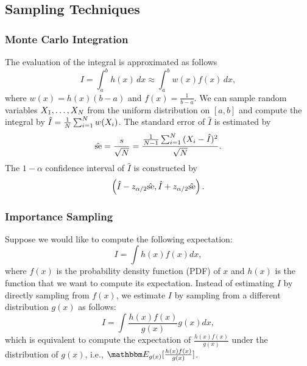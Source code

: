     
\subsection{Sampling Techniques}
    \subsubsection{Monte Carlo Integration}
        The evaluation of the integral is approximated as follows
            \begin{equation}
                I = \int_{a}^{b}{h(x) \, dx} \approx \int_{a}^{b}{w(x) f(x) \, dx},
            \end{equation}
        where $w(x) = h(x)(b-a)$ and $f(x) = \frac{1}{b-a}$.
        We can sample \ndata random variables $X_1, \ldots, X_{N}$ from the uniform distribution on $[a, b]$ and compute the integral by $\hat{I} = \frac{1}{N}\sum_{i=1}^{N}{w(X_i)}$.
        The standard error of $\hat{I}$ is estimated by
            \begin{equation}
                \hat{\text{se}} = \frac{s}{\sqrt{N}} = \frac{ \frac{1}{N-1}\sum_{i=1}^{N}{(X_i - \hat{I} )^2}}{\sqrt{N}}.
            \end{equation}
        The $1-\alpha$ confidence interval of $\hat{I}$ is constructed by
            \begin{equation}
                \left( \hat{I} - z_{\alpha/2}\hat{\text{se}}, \hat{I}+ z_{\alpha/2}\hat{\text{se}} \right).
            \end{equation}
        
    \subsubsection{Importance Sampling}
        Suppose we would like to compute the following expectation:
            \begin{equation}
                I = \int h(x) f(x) d x,
            \end{equation}
        where $f(x)$ is the probability density function (PDF) of $x$ and  $h(x)$ is the function that we want to compute its expectation. 
        Instead of estimating $I$ by directly sampling from $f(x)$, we estimate $I$ by sampling from a different distribution $g(x)$ as follows:
            \begin{equation}\label{eq:importance_sampling}
                I = \int \frac{h(x) f(x)}{g(x)} g(x) dx,
            \end{equation}
        which is equivalent to compute the expectation of $\frac{h(x) f(x)}{g(x)}$ under the distribution of $g(x)$, i.e., $\E_{g(x)}[\frac{h(x) f(x)}{g(x)}]$.
            
